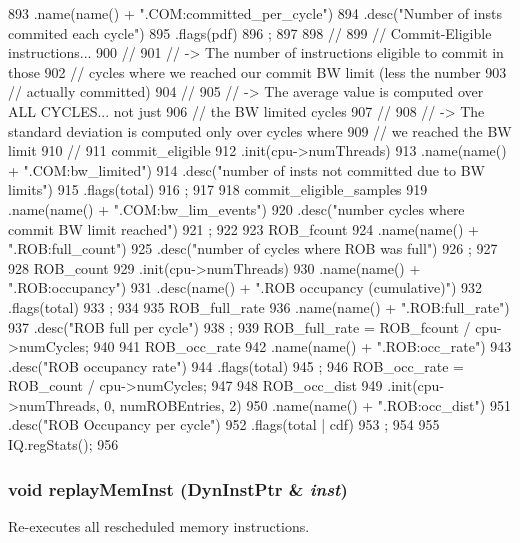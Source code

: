 \begin{DoxyCode}
{893         .name(name() + ".COM:committed_per_cycle")
894         .desc("Number of insts commited each cycle")
895         .flags(pdf)
896         ;
897 
898     //
899     //  Commit-Eligible instructions...
900     //
901     //  -> The number of instructions eligible to commit in those
902     //  cycles where we reached our commit BW limit (less the number
903     //  actually committed)
904     //
905     //  -> The average value is computed over ALL CYCLES... not just
906     //  the BW limited cycles
907     //
908     //  -> The standard deviation is computed only over cycles where
909     //  we reached the BW limit
910     //
911     commit_eligible
912         .init(cpu->numThreads)
913         .name(name() + ".COM:bw_limited")
914         .desc("number of insts not committed due to BW limits")
915         .flags(total)
916         ;
917 
918     commit_eligible_samples
919         .name(name() + ".COM:bw_lim_events")
920         .desc("number cycles where commit BW limit reached")
921         ;
922 
923     ROB_fcount
924         .name(name() + ".ROB:full_count")
925         .desc("number of cycles where ROB was full")
926         ;
927 
928     ROB_count
929         .init(cpu->numThreads)
930         .name(name() + ".ROB:occupancy")
931         .desc(name() + ".ROB occupancy (cumulative)")
932         .flags(total)
933         ;
934 
935     ROB_full_rate
936         .name(name() + ".ROB:full_rate")
937         .desc("ROB full per cycle")
938         ;
939     ROB_full_rate = ROB_fcount / cpu->numCycles;
940 
941     ROB_occ_rate
942         .name(name() + ".ROB:occ_rate")
943         .desc("ROB occupancy rate")
944         .flags(total)
945         ;
946     ROB_occ_rate = ROB_count / cpu->numCycles;
947 
948     ROB_occ_dist
949         .init(cpu->numThreads, 0, numROBEntries, 2)
950         .name(name() + ".ROB:occ_dist")
951         .desc("ROB Occupancy per cycle")
952         .flags(total | cdf)
953         ;
954 
955     IQ.regStats();
956 }
\end{DoxyCode}
\hypertarget{classBackEnd_ae165df775b4de9e9430228c7f04c2bc9}{
\subsubsection[{replayMemInst}]{\setlength{\rightskip}{0pt plus 5cm}void replayMemInst ({\bf DynInstPtr} \& {\em inst})}}
\label{classBackEnd_ae165df775b4de9e9430228c7f04c2bc9}
Re-\/executes all rescheduled memory instructions. 


